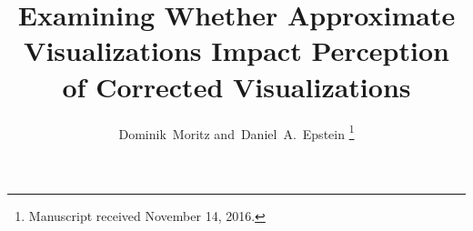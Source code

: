 \documentclass[10pt,journal,compsoc]{IEEEtran}
\begin{document}
%
\title{Examining Whether Approximate Visualizations Impact Perception of Corrected Visualizations}
%
%
%
%

\author{Dominik~Moritz
        and~Daniel~A.~Epstein
\thanks{Manuscript received November 14, 2016.}}

% 
%
\end{document}
